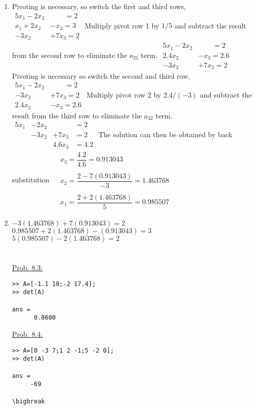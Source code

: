 \documentclass[../main.tex]{subfiles}
\begin{document}
\begin{enumerate}[label=\bfseries(\alph*)]
\item Pivoting is necessary, so switch the first and third rows,
\bigbreak$
\begin{aligned}
5 x_{1}-2 x_{2}& \quad\quad=2 \\
x_{1}+2 x_{2}&-x_{3}=3 \\
-3 x_{2}&+7 x_{3}=2
\end{aligned}$
\bigbreak
Multiply pivot row 1 by $1 / 5$ and subtract the result from the second row to eliminate the $a_{21}$ term.
\bigbreak$
\begin{aligned}
5 x_{1}-2 x_{2}& \quad\quad=2 \\
2.4 x_{2}&-x_{3}=2.6 \\
-3 x_{2}&+7 x_{3}=2
\end{aligned}$
\bigbreak
Pivoting is necessary so switch the second and third row,
\bigbreak$
\begin{aligned}
5 x_{1}-2 x_{2}		&	\quad\quad		=2 \\
-3 x_{2}&+7 x_{3}=2 \\
2.4 x_{2}&-x_{3}=2.6
\end{aligned}$
\bigbreak
Multiply pivot row 2 by $2.4 /(-3)$ and subtract the result from the third row to eliminate the $a_{32}$ term.
\bigbreak$
\begin{aligned}
5 x_{1}		&-2 x_{2}	&&=2 \\
				&-3 x_{2}		&+7 x_{3}&=2 \\
& &4.6 x_{3}&=4.2
\end{aligned}$
\bigbreak
The solution can then be obtained by back substitution
\bigbreak$
\begin{aligned}
&x_{3}=\dfrac{4.2}{4.6}=0.913043 \\\\
&x_{2}=\dfrac{2-7(0.913043)}{-3}=1.463768\\\\
&x_{1}=\dfrac{2+2(1.463768)}{5}=0.985507
\end{aligned}$
\bigbreak
\bigbreak
\item
$-3(1.463768)+7(0.913043)=2$
\bigbreak
$0.985507+2(1.463768)-(0.913043)=3$
\bigbreak
$5(0.985507)-2(1.463768)=2$
\bigbreak

\section{}
\underline{Prob. 8.3:}
\bigbreak
\begin{lstlisting}[numbers=none]
>> A=[-1.1 10;-2 17.4];
>> det(A)

ans =
	  0.8600
\end{lstlisting}
\bigbreak
\underline{Prob. 8.4:}
\bigbreak
\begin{lstlisting}[numbers=none]
>> A=[0 -3 7;1 2 -1;5 -2 0];
>> det(A)

ans =
 	 -69 

\bigbreak
\end{lstlisting}
\end{enumerate}
\end{document}
